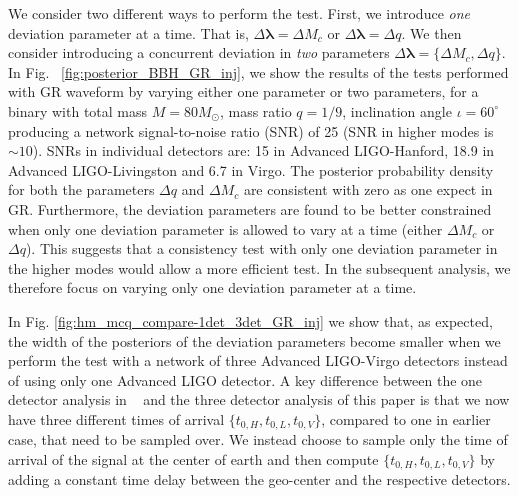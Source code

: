 \documentclass[prd,preprintnumbers,twocolumn,eqsecnum,floatfix,a4paper,nofootinbib,superscriptaddress]{revtex4}
\newcommand{\blambda}{\bm{\lambda}}
\begin{document}
We consider two different ways to perform the test. First, we introduce \emph{one} deviation parameter at a time. That is, $\Delta\blambda = {\Delta M_c}$ or $\Delta\blambda = {\Delta q}$. We then consider introducing a concurrent deviation in \emph{two} parameters $\Delta \blambda = \{\Delta M_c, \Delta q\}$. In Fig. 
~\ref{fig:posterior_BBH_GR_inj}, we show the results of the tests performed with GR waveform by varying either one parameter or two parameters, for a binary with total mass $M = 80M_{\odot}$, mass ratio $q=1/9$, inclination angle $ {\iota}=60^{\circ} $ producing a network signal-to-noise ratio  (SNR)  of 25 (SNR in higher modes is $\sim 10$). SNRs in individual detectors are: 15 in Advanced LIGO-Hanford, 18.9 in Advanced LIGO-Livingston and 6.7 in Virgo. The posterior probability density for both the parameters $\Delta q$ and $\Delta M_c$ are consistent with zero as one expect in GR. Furthermore, the deviation parameters are found to be better constrained when only one deviation parameter is allowed to vary at a time (either $\Delta M_c$ or $\Delta q$). This suggests that a consistency test with only one deviation parameter in the higher modes would allow a more efficient test. In the subsequent analysis, we therefore focus on varying only one deviation parameter at a time. 

In Fig. \ref{fig:hm_mcq_compare-1det_3det_GR_inj} we show that, as expected, the width of the posteriors of the deviation parameters become smaller when we perform the test with a network of three Advanced LIGO-Virgo detectors instead of using only one Advanced LIGO detector. A key difference between the one detector analysis in ~\cite{dhanpal2018} and the three detector analysis of this paper is that we now have three different times of arrival $\{ t_{0,H}, t_{0,L}, t_{0,V}\}$, compared to one in earlier case, that need to be sampled over. We instead choose to sample only the time of arrival of the signal at the center of earth and then compute $\{ t_{0,H}, t_{0,L}, t_{0,V}\}$ by adding a constant time delay between the geo-center and the respective detectors.
 
\end{document}
